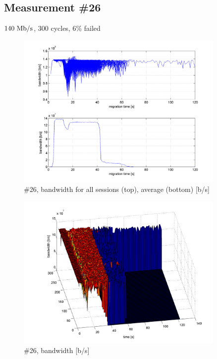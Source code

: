 \subsection{Measurement \#26}
$140~\mathrm{Mb/s}$, $300$ cycles, 6\% failed
\begin{figure}[hp]
	\begin{center}
	\includegraphics[width=0.9\textwidth]{results-269-all.png}
	\end{center}
	\caption[]{\#26, bandwidth for all sessions (top), average (bottom) [b/s]}
	\label{img:results-269-all.png}
\end{figure}
\begin{figure}[hp]
	\begin{center}
	\includegraphics[width=0.9\textwidth]{results-269-3d.png}
	\end{center}
	\caption[]{\#26, bandwidth [b/s]}
	\label{img:results-269-3d.png}
\end{figure}

